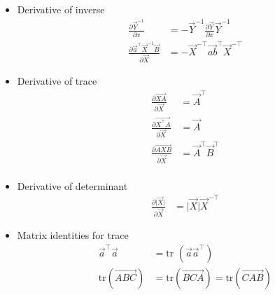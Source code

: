 \documentclass[12pt,twoside]{article}
\begin{document}
\begin{itemize}
\item Derivative of inverse
	\begin{align*}
		\frac{\partial \vec{Y}^{-1}}{\partial x} &= -\vec{Y}^{-1}\frac{\partial \vec{Y}}{\partial x}\vec{Y}^{-1}\\
		\frac{\partial \vec{a}^\top\vec{X}^{-1}\vec{B}}{\partial \vec{X}} &= -\vec{X}^{-\top}\vec{ab}^\top\vec{X}^{-\top}
	\end{align*}

\item Derivative of trace
\begin{align*}
	\frac{\partial  \vec{XA}}{\partial \vec{X}} & = \vec{A}^\top\\
	\frac{\partial  \vec{X^\top A}}{\partial \vec{X}} & = \vec{A}\\
	\frac{\partial  \vec{AXB}}{\partial \vec{X}} & = \vec{A}^\top\vec{B}^\top\\
\end{align*}

\item Derivative of determinant
	\begin{align*}
		\frac{\partial \vert \vec{X}\vert}{\partial \vec{X}} & = \vert \vec{X}\vert \vec{X}^{-\top}
	\end{align*}

\item Matrix identities for trace
	\begin{align*}
		\vec{a}^\top \vec{a} &= \text{tr }(\vec{a}\vec{a}^\top)\\
		\text{tr}(\vec{ABC}) &= \text{tr}(\vec{BCA}) = \text{tr}(\vec{CAB}) 
	\end{align*}

\end{itemize}
\end{document}
